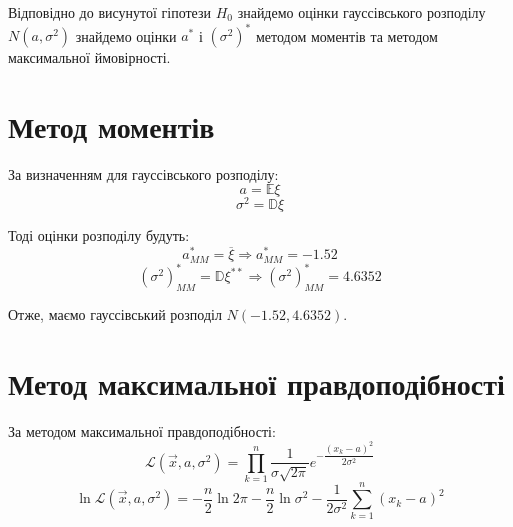 \documentclass[14pt, a4paper, ukrainian]{extreport}
\begin{document}
	Відповідно до висунутої гіпотези $H_0$ знайдемо оцінки гауссівського розподілу $N (a, \sigma^2)$ знайдемо оцінки $a^*$ і $(\sigma^2)^*$ методом моментів та методом максимальної ймовірності. 
	
	\section{Метод моментів}
	
	За визначенням для гауссівського розподілу:
	$$a = \mathbb{E}\xi$$
	$$\sigma^2 = \mathbb{D}\xi$$
	
	Тоді оцінки розподілу будуть:
	$$ a_{MM}^* = \overline{\xi} \Rightarrow a_{MM}^* = -1.52$$
	$$ (\sigma^2)_{MM}^* = \mathbb{D}\xi^{**} \Rightarrow (\sigma^2)_{MM}^* = 4.6352$$
	
	Отже, маємо гауссівський розподіл $N (-1.52, 4.6352)$.
	
	\section{Метод максимальної правдоподібності}
	
	За методом максимальної правдоподібності:
	$$ \mathcal{L}(\vec{x}, a, \sigma^2)  = \prod_{k = 1}^{n} \frac{1}{\sigma\sqrt{2\pi}}e^{-\dfrac{(x_k - a)^2}{2\sigma^2}}$$
	$$ \ln\mathcal{L}(\vec{x}, a, \sigma^2)  = -\frac{n}{2} \ln 2\pi - \frac{n}{2}\ln \sigma^2 - \frac{1}{2\sigma^2}\sum_{k = 1}^{n}(x_k - a)^2$$
	
\end{document}
